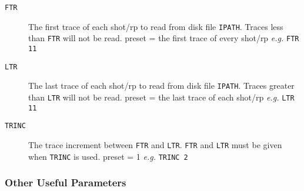 \begin{description}
\item[\texttt{FTR}]    The first trace of each \gls{shot}/\gls{rp} to read from disk file
         \texttt{IPATH}.  Traces less than \texttt{FTR} will not be read.
         \Gls{preset} = the first trace of every \gls{shot}/\gls{rp}   \textit{e.g.}   \texttt{FTR  11}

\item[\texttt{LTR}]    The last trace of each \gls{shot}/\gls{rp} to read from disk file
         \texttt{IPATH}.  Traces greater than \texttt{LTR} will not be read.
         \Gls{preset} = the last trace of each \gls{shot}/\gls{rp} \textit{e.g.}   \texttt{LTR 11}

\item[\texttt{TRINC}]  The trace increment between \texttt{FTR} and \texttt{LTR}.  \texttt{FTR} and \texttt{LTR}
         must be given when \texttt{TRINC} is used.
         \Gls{preset} = 1     \textit{e.g.}    \texttt{TRINC 2}
\end{description}

\subsubsection{Other Useful Parameters}

